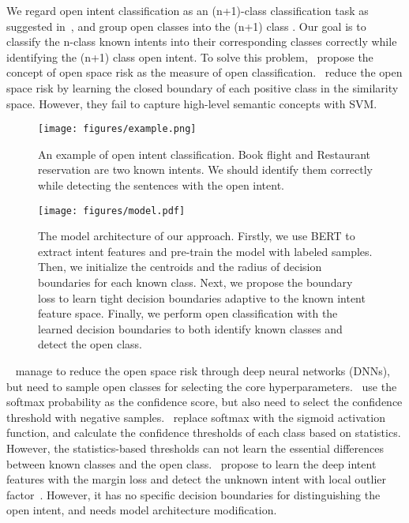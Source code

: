 \documentclass[letterpaper]{article} \usepackage{aaai21}  \usepackage{times}  \usepackage{helvet} \usepackage{courier}  \usepackage[hyphens]{url}  \usepackage{graphicx} \urlstyle{rm} \def\UrlFont{\rm}  \usepackage{natbib}  \usepackage{caption} \frenchspacing  \setlength{\pdfpagewidth}{8.5in}  \setlength{\pdfpageheight}{11in}  \usepackage{amsmath}
\begin{document}
	We regard open intent classification as an (n+1)-class classification task as suggested in~\cite{Shu2017DOCDO,lin-xu-2019-deep}, and group open classes into the (n+1) class . Our goal is to classify the n-class known intents into their corresponding classes correctly while identifying the (n+1) class open intent. To solve this problem,~\citet{scheirer2013toward} propose the concept of open space risk as the measure of open classification.~\citet{fei-liu-2016-breaking} reduce the open space risk by learning the closed boundary of each positive class in the similarity space. However, they fail to capture high-level semantic concepts with SVM. 
	\begin{figure}[t!]
		\centering  
		\texttt{[image: figures/example.png]}
		\caption{\label{example} An example of open intent classification. Book flight and Restaurant reservation are two known intents. We should identify them correctly while detecting the sentences with the open intent. }
	\end{figure}
	\begin{figure*}
		\centering
		\texttt{[image: figures/model.pdf]}
		\caption{The model architecture of our approach. Firstly, we use BERT to extract intent features and pre-train the model with labeled samples. Then, we initialize the centroids    and the radius of decision boundaries  for each known class. Next, we propose the boundary loss to learn tight decision boundaries adaptive to the known intent feature space. Finally, we perform open classification with the learned decision boundaries to both identify known classes and detect the open class.}
		\label{model}
	\end{figure*}~\citet{bendale2016towards} manage to reduce the open space risk through deep neural networks (DNNs), but need to sample open classes for selecting the core hyperparameters.~\citet{hendrycks17baseline} use the softmax probability as the confidence score, but also need to select the confidence threshold with negative samples.~\citet{Shu2017DOCDO} replace softmax with the sigmoid activation function, and calculate the confidence thresholds of each class based on statistics. However, the statistics-based thresholds can not learn the essential differences between known classes and the open class.~\citet{lin-xu-2019-deep} propose to learn the deep intent features with the margin loss and detect the unknown intent with local outlier factor~\cite{breunig2000lof}. However, it has no specific decision boundaries for distinguishing the open intent, and needs model architecture modification. 
	
\end{document}
